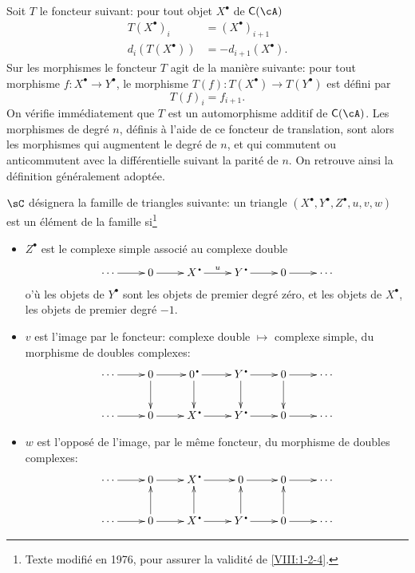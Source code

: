 Soit $T$ le foncteur suivant: pour tout objet $X^\bullet$ de $\eC(\cA)$ 
\begin{align*}
  T(X^\bullet)_i &= (X^\bullet)_{i+1} \\
  d_i(T(X^\bullet)) &= -d_{i+1}(X^\bullet)  \text{.}
\end{align*}
Sur les morphismes le foncteur $T$ agit de la mani\`ere suivante: pour tout 
morphisme $f:X^\bullet \to Y^\bullet$, le morphisme 
$T(f):T(X^\bullet) \to T(Y^\bullet)$ est d\'efini par 
\[
  T(f)_i = f_{i+1} \text{.}
\]
On v\'erifie imm\'ediatement que $T$ est un automorphisme additif de 
$\eC(\cA)$. Les morphismes de degr\'e $n$, d\'efinis \`a l'aide de ce foncteur 
de translation, sont alors les morphismes qui augmentent le degr\'e de $n$, et 
qui commutent ou anticommutent avec la diff\'erentielle suivant la parit\'e de 
$n$. On retrouve ainsi la d\'efinition g\'en\'eralement adopt\'ee. 

$\sC$ d\'esignera la famille de triangles suivante: un triangle 
$(X^\bullet,Y^\bullet,Z^\bullet,u,v,w)$ est un \'el\'ement de la famille 
si\footnote{Texte modifi\'e en 1976, pour assurer la validit\'e de 
\ref{VIII:1-2-4}.}
\begin{itemize}
  \item $Z^\bullet$ est le complexe simple associ\'e au complexe double 
    \[\xymatrix{
      \cdots \ar[r] 
        & 0 \ar[r] 
        & X^\bullet \ar[r]^-u 
        & Y^\bullet \ar[r] 
        & 0 \ar[r] 
        & \cdots 
    }\]
    o'\`u les objets de $Y^\bullet$ sont les objets de premier degr\'e z\'ero, 
    et les objets de $X^\bullet$, les objets de premier degr\'e $-1$. 
  \item $v$ est l'image par le foncteur: complexe double $\mapsto$ complexe 
    simple, du morphisme de doubles complexes: 
    \[\xymatrix{
      \cdots \ar[r] 
        & 0 \ar[r] \ar[d] 
        & 0^\bullet \ar[r] \ar[d] 
        & Y^\bullet \ar[r] \ar[d] 
        & 0 \ar[r] \ar[d] 
        & \cdots \\
      \cdots \ar[r] 
        & 0 \ar[r] 
        & X^\bullet \ar[r] 
        & Y^\bullet \ar[r] 
        & 0 \ar[r] 
        & \cdots 
    }\]
  \item $w$ est l'oppos\'e de l'image, par le m\^eme foncteur, du morphisme de 
    doubles complexes: 
    \[\xymatrix{
      \cdots \ar[r] 
        & 0 \ar[r] 
        & X^\bullet \ar[r] 
        & 0 \ar[r] 
        & 0 \ar[r] 
        & \cdots \\
      \cdots  \ar[r] 
        & 0 \ar[r] \ar[u] 
        & X^\bullet \ar[r] \ar[u] 
        & Y^\bullet \ar[r] \ar[u] 
        & 0 \ar[r] \ar[u] 
        & \cdots 
    }\]
\end{itemize}





